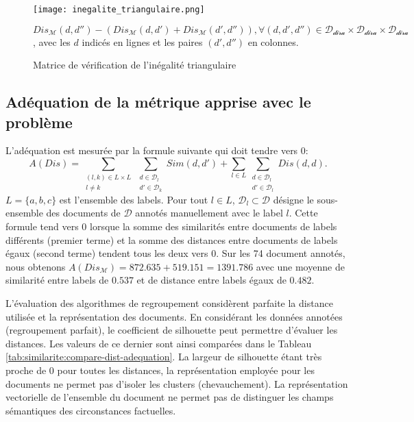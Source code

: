 \begin{figure}[!htb]
	\centering \texttt{[image: inegalite\_triangulaire.png]}
	
	\scriptsize{$Dis_\mathcal{M}(d,d'') - (Dis_\mathcal{M}(d,d') + Dis_\mathcal{M}(d',d'')), \forall (d,d',d'') \in \mathcal{D_{\text{dira}}} \times \mathcal{D_{\text{dira}}} \times \mathcal{D_{\text{dira}}}$, avec les $d$ indicés en lignes et les paires $(d',d'')$ en colonnes.}
	\caption{Matrice de vérification de l'inégalité triangulaire}\label{fig:similarite:matrice_inegalite_triangulaire}
\end{figure}
 


\subsection{Adéquation de la métrique apprise avec le problème}
\label{sec:similarite:adequation}
L'adéquation est mesurée par la formule suivante qui doit tendre vers 0: \[A(Dis) = \sum\limits_{\substack{(l,k) \in L \times L \\ l \neq k}} \sum\limits_{\substack{d \in \mathcal{D}_l \\ d' \in \mathcal{D}_k}} Sim(d,d') + \sum\limits_{l \in L} \sum\limits_{\substack{d \in \mathcal{D}_l \\ d' \in \mathcal{D}_l}} Dis(d,d). \] $L = \lbrace a, b, c \rbrace$ est l'ensemble des labels. Pour tout $l \in L$, $\mathcal{D}_l \subset \mathcal{D}$ désigne le sous-ensemble des documents de $\mathcal{D}$ annotés manuellement avec le label $l$. Cette formule tend vers 0 lorsque la somme des similarités entre documents de labels différents (premier terme) et la somme des distances entre documents de labels égaux (second terme) tendent tous les deux vers 0.
Sur les 74 document annotés, nous obtenons $A(Dis_\mathcal{M}) = 872.635 + 519.151 = 1391.786$ avec une moyenne de similarité entre labels de $0.537$ et de distance entre labels égaux de $0.482$.

L'évaluation des algorithmes de regroupement considèrent parfaite la distance utilisée et la représentation des documents. En considérant les données annotées (regroupement parfait), le coefficient de silhouette peut  permettre d'évaluer les distances. Les valeurs de ce dernier sont ainsi comparées dans le Tableau \ref{tab:similarite:compare-dist-adequation}. La largeur de silhouette étant très proche de 0 pour toutes les distances, la représentation employée pour les documents ne permet pas d'isoler les clusters (chevauchement). La représentation vectorielle de l'ensemble du document ne permet pas de distinguer les champs sémantiques des circonstances factuelles.

